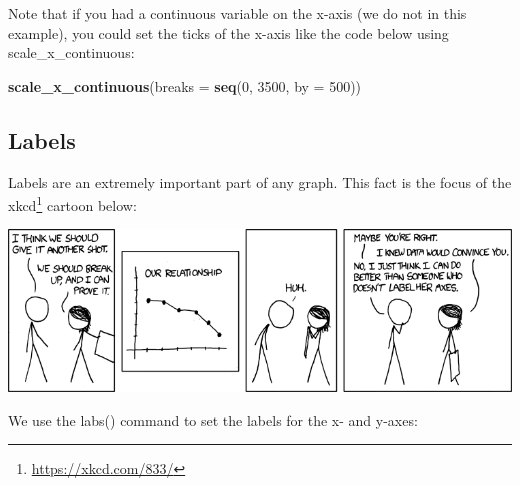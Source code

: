 \documentclass[
]{krantz}
\makeatletter
\newenvironment{Shaded}{\begin{snugshade}}{\end{snugshade}}
\newcommand{\DataTypeTok}[1]{\textcolor[rgb]{0.27,0.27,0.27}{#1}}
\newcommand{\DecValTok}[1]{\textcolor[rgb]{0.06,0.06,0.06}{#1}}
\newcommand{\KeywordTok}[1]{\textcolor[rgb]{0.27,0.27,0.27}{\textbf{#1}}}
\newcommand{\NormalTok}[1]{#1}
\renewcommand{\href}[2]{#2\footnote{\url{#1}}}
\newenvironment{kframe}{%
\medskip{}
\setlength{\fboxsep}{.8em}
 \def\at@end@of@kframe{}%
 \ifinner\ifhmode%
  \def\at@end@of@kframe{\end{minipage}}%
  \begin{minipage}{\columnwidth}%
 \fi\fi%
 \def\FrameCommand##1{\hskip\@totalleftmargin \hskip-\fboxsep
 \colorbox{shadecolor}{##1}\hskip-\fboxsep
     \hskip-\linewidth \hskip-\@totalleftmargin \hskip\columnwidth}%
 \MakeFramed {\advance\hsize-\width
   \@totalleftmargin\z@ \linewidth\hsize
   \@setminipage}}%
 {\par\unskip\endMakeFramed%
 \at@end@of@kframe}
\renewenvironment{Shaded}{\begin{kframe}}{\end{kframe}}
\makeatother
\begin{document}
Note that if you had a continuous variable on the x-axis (we do not in this example), you could set the ticks of the x-axis like the code below using scale\_x\_continuous:

\begin{Shaded}
\begin{Highlighting}[]
\KeywordTok{scale_x_continuous}\NormalTok{(}\DataTypeTok{breaks =} \KeywordTok{seq}\NormalTok{(}\DecValTok{0}\NormalTok{, }\DecValTok{3500}\NormalTok{, }\DataTypeTok{by =} \DecValTok{500}\NormalTok{))}
\end{Highlighting}
\end{Shaded}

\hypertarget{labels}{%
\subsection{Labels}\label{labels}}

Labels are an extremely important part of any graph. This fact is the focus of the \href{https://xkcd.com/833/}{xkcd} cartoon below:

\includegraphics[width=0.8\linewidth]{ch_graphing/images/convincing}

We use the labs() command to set the labels for the x- and y-axes:
\end{document}
